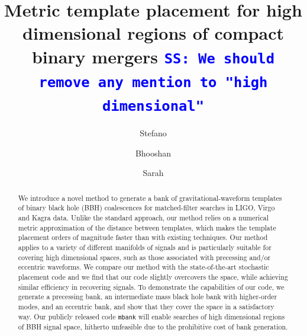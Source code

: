 \documentclass[twocolumn,showpacs,preprintnumbers,nofootinbib,prd,
superscriptaddress,10pt]{revtex4-2}
\newcommand{\stefano}[1]{{\textcolor{blue}{\texttt{SS: #1}} }}
\begin{document}
\begin{abstract}
	We introduce a novel method to generate a bank of gravitational-waveform templates of binary black hole (BBH) coalescences for matched-filter searches in LIGO, Virgo and Kagra data. Unlike the standard approach, our method relies on a numerical metric approximation of the distance between templates, which makes the template placement orders of magnitude faster than with existing techniques.
	Our method applies to a variety of different manifolds of signals and is particularly suitable for covering high dimensional spaces, such as those associated with precessing and/or eccentric waveforms.
	We compare our method with the state-of-the-art stochastic placement code and we find that our code slightly overcovers the space, while achieving similar efficiency in recovering signals. To demonstrate the capabilities of our code, we generate a precessing bank, an intermediate mass black hole bank with higher-order modes, and an eccentric bank, and show that they cover the space in a satisfactory way.
	Our publicly released code \texttt{mbank} will enable searches of high dimensional regions of BBH signal space, hitherto unfeasible due to the prohibitive cost of bank generation.
\end{abstract}
	
	\title{Metric template placement for high dimensional regions of compact binary mergers \stefano{We should remove any mention to "high dimensional"}}
	\author{Stefano }

	\author{Bhooshan }
        
	\author{Sarah }
	\maketitle
\end{document}
